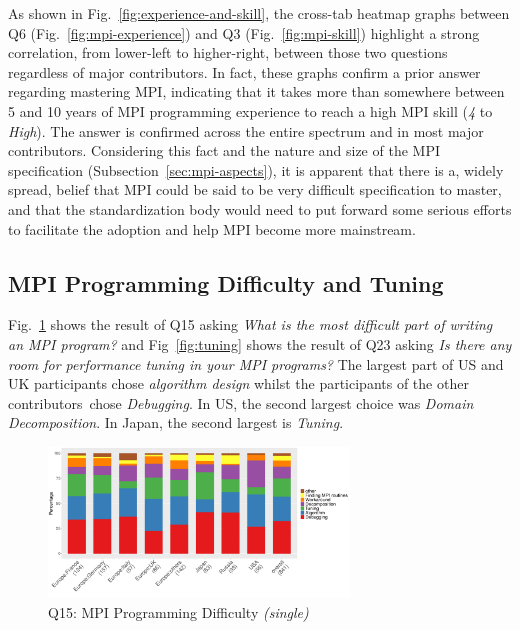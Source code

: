 \documentclass[preprint,5p,times]{elsarticle}
\def\myquote#1{{\it #1}}
\newcommand{\revision}[2]{{\color{blue}#2}}
\def\countries{contributors\xspace{}}%
\def\mcountries{major contributors\xspace{}}%
\begin{document}
As shown in Fig.~\ref{fig:experience-and-skill}, the cross-tab heatmap graphs
between Q6 (Fig.~\ref{fig:mpi-experience}) and Q3 \revision{(Fig.~\ref{fig:mpi-skill}),}{(Fig.~\ref{fig:mpi-skill})}
highlight a strong correlation, from lower-left to higher-right, between those
two questions regardless of \mcountries. In fact, these graphs confirm a prior
answer regarding mastering MPI, indicating that it takes more than somewhere
between 5 and 10 years of MPI programming experience to reach a high MPI skill
(\myquote{4} to \myquote{High}). The answer is confirmed across the entire
spectrum and in most \mcountries.
Considering this fact and the nature and size of the MPI specification
(Subsection~\ref{sec:mpi-aspects}), it is apparent that there is a, widely
spread, belief that MPI could be said to be very difficult specification to
master, and that the standardization body would need to put forward some serious
efforts to facilitate the adoption and help MPI become more mainstream.

\subsection{MPI Programming Difficulty and Tuning}

Fig.~\ref{fig:difficulty} shows the result of Q15 asking \myquote{What is the
most difficult part of writing an MPI program?} and
Fig~\ref{fig:tuning} shows the result of Q23 asking \myquote{Is there any
room for performance tuning in your MPI programs?} The largest part
of US and UK participants chose \myquote{algorithm design} whilst the
participants of the other \countries\  chose
\myquote{Debugging}. In US, the second largest choice was
\myquote{Domain Decomposition}. In Japan, the second largest is
\myquote{Tuning}.

\begin{figure}[tb]
\begin{center}
\includegraphics[width=8.0cm]{R-scripts/Q15.pdf}
\caption{Q15: MPI Programming Difficulty {\it(single)}}
\label{fig:difficulty}
\vspace{-3mm}%
\end{center}
\end{figure}
\end{document}
